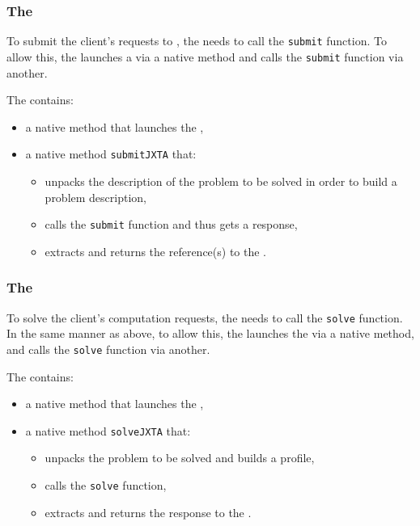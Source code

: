 \subsubsection{The \MAdiet}
\label{sssec:jnima}

To submit the client's requests to \diet, the \MAj needs to call the \MAdiet
\texttt{submit} function. To allow this, the \MAj launches a \MAdiet via a
native method and calls the \texttt{submit} function via another.

The \MAdiet contains:

\begin{itemize}
\item{a native method that launches the \MAdiet,}
\item{a native method \texttt{submitJXTA} that:}
\begin{itemize}
\item{unpacks the description of the problem to be solved in order to
    build a \diet problem description,}
\item{calls the \diet \texttt{submit} function and thus gets a
    response,}
\item{extracts and returns the \sed reference(s) to the \MAj.}
  \end{itemize}
\end{itemize}

\subsubsection{The \seddiet}
\label{sssec:jnised}

To solve the client's computation requests, the \sedj needs to call the
\seddiet \texttt{solve} function. In the same manner as above, to allow this,
the \sedj launches the \seddiet via a native method, and calls the
\texttt{solve} function via another.

The \seddiet contains:

\begin{itemize}
\item{a native method that launches the \seddiet,}
\item{a native method \texttt{solveJXTA} that:}
  \begin{itemize}
  \item{unpacks the problem to be solved and builds a \diet profile,}
  \item{calls the \texttt{solve} function,}
  \item{extracts and returns the response to the \sedj.}
  \end{itemize}
\end{itemize}

